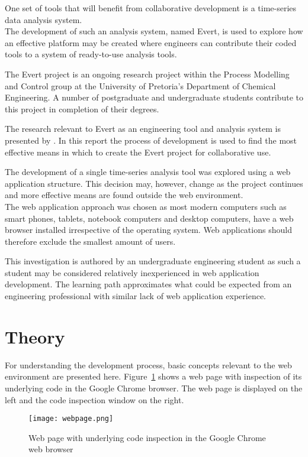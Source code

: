\documentclass[a4paper,12pt]{article}
\begin{document}
One set of tools that will benefit from collaborative development is a time-series data analysis system.\\The development of such an analysis system, named Evert, is used to explore how an effective platform may be created where engineers can contribute their coded tools to a system of ready-to-use analysis tools.

The Evert project is an ongoing research project within the Process Modelling and Control group at the University of Pretoria's Department of Chemical Engineering. A number of postgraduate and undergraduate students contribute to this project in completion of their degrees.

The research relevant to Evert as an engineering tool and analysis system is presented by \citet{oos_wil}. In this report the process of development is used to find the most effective means in which to create the Evert project for collaborative use.

The development of a single time-series analysis tool was explored using a web application structure. This decision may, however, change as the project continues and more effective means are found outside the web environment.\\The web application approach was chosen as most modern computers such as smart phones, tablets, notebook computers and desktop computers, have a web browser installed irrespective of the operating system. Web applications should therefore exclude the smallest amount of users.

This investigation is authored by an undergraduate engineering student as such a student may be considered relatively inexperienced in web application development. The learning path approximates what could be expected from an engineering professional with similar lack of web application experience.

\section{Theory}
For understanding the development process, basic concepts relevant to the web environment are presented here. Figure~\ref{fig:webpage} shows a web page with inspection of its underlying code in the Google Chrome browser. The web page is displayed on the left and the code inspection window on the right.

\begin{figure}[htbp]
  \centering
  \texttt{[image: webpage.png]}
  \caption[Web page with inspection of code]{Web page with underlying code inspection in the Google Chrome web browser}
  \label{fig:webpage}
\end{figure}
\end{document}
